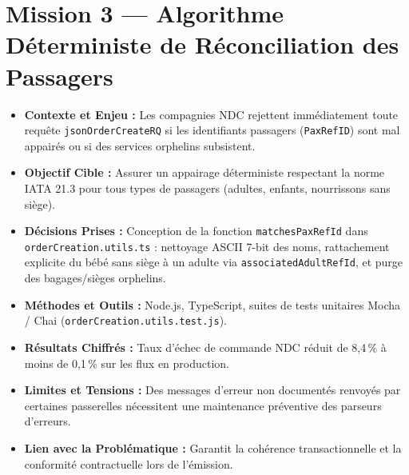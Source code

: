 \documentclass[11pt,a4paper]{article}
\begin{document}
\section{Mission 3 — Algorithme Déterministe de Réconciliation des Passagers}
\begin{itemize}[itemsep=2pt]
    \item \textbf{Contexte et Enjeu :} Les compagnies NDC rejettent immédiatement toute requête \texttt{jsonOrderCreateRQ} si les identifiants passagers (\texttt{PaxRefID}) sont mal appairés ou si des services orphelins subsistent.
    \item \textbf{Objectif Cible :} Assurer un appairage déterministe respectant la norme IATA 21.3 pour tous types de passagers (adultes, enfants, nourrissons sans siège).
    \item \textbf{Décisions Prises :} Conception de la fonction \texttt{matchesPaxRefId} dans \texttt{orderCreation.utils.ts} : nettoyage ASCII 7-bit des noms, rattachement explicite du bébé sans siège à un adulte via \texttt{associatedAdultRefId}, et purge des bagages/sièges orphelins.
    \item \textbf{Méthodes et Outils :} Node.js, TypeScript, suites de tests unitaires Mocha / Chai (\texttt{orderCreation.utils.test.js}).
    \item \textbf{Résultats Chiffrés :} Taux d'échec de commande NDC réduit de 8,4\,\% à moins de 0,1\,\% sur les flux en production.
    \item \textbf{Limites et Tensions :} Des messages d'erreur non documentés renvoyés par certaines passerelles nécessitent une maintenance préventive des parseurs d'erreurs.
    \item \textbf{Lien avec la Problématique :} Garantit la cohérence transactionnelle et la conformité contractuelle lors de l'émission.
\end{itemize}
\end{document}
